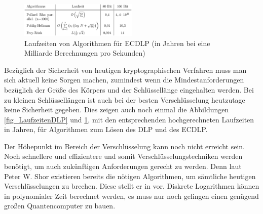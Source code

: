 	\begin{figure}
		\centering
		\includegraphics[width=0.5\textwidth]{includes/images/LaufzeitenECDLP.PNG}
		\caption{Laufzeiten von Algorithmen für ECDLP (in Jahren bei eine Milliarde Berechnungen pro Sekunden)~\cite{DLP:ECDLP:Probleme:und:Loesungen}}
		\label{fig_LaufzeitenECDLP}
	\end{figure}

	Bezüglich der Sicherheit von heutigen kryptographischen Verfahren muss man sich aktuell keine Sorgen machen, zumindest wenn die Mindestanforderungen bezüglich der Größe des Körpers und der Schlüssellänge eingehalten werden. Bei zu kleinen Schlüssellängen ist auch bei der besten Verschlüsselung heutzutage keine Sicherheit gegeben. Dies zeigen auch noch einmal die Abbildungen \ref{fig_LaufzeitenDLP} und \ref{fig_LaufzeitenECDLP}, mit den entsprechenden hochgerechneten Laufzeiten in Jahren, für Algorithmen zum Lösen des DLP und des ECDLP.
	
	Der Höhepunkt im Bereich der Verschlüsselung kann noch nicht erreicht sein. Noch schnellere und effizientere und somit  Verschlüsselungstechniken werden benötigt, um auch zukünftigen Anforderungen gerecht zu werden. Denn laut Peter W. Shor existieren bereits die nötigen Algorithmen, um sämtliche heutigen Verschlüsselungen zu brechen. Diese stellt er in \cite{Algorithms:for:Quantum:Computation:Discrete:Logarithms:and:Factoring} vor. Diskrete Logarithmen können in polynomialer Zeit berechnet werden, es muss nur noch gelingen einen genügend großen Quantencomputer zu bauen.